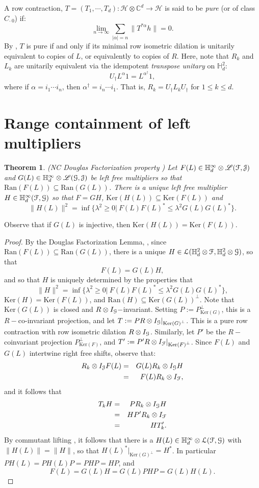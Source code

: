 \documentclass[11pt]{article}
\newcommand{\ba}{\begin{eqnarray}}
\newcommand{\ea}{\end{eqnarray}}
\newcommand{\nn}{\nonumber}
\newcommand{\scr}{\ensuremath{\mathscr}}
\newcommand{\mc}{\ensuremath{\mathcal}}
\newcommand{\la}{\ensuremath{\lambda }}
\def\C{\mathbb{C}}
\def\cH{\mathcal{H}}
\def\bH{\mathbb{H}}
\newcommand{\J}{\ensuremath{\mathcal{J} }}
\newcommand{\ran}[1]{\ensuremath{\mathrm{Ran} \left( {#1} \right) }}
\renewcommand{\ker}[1]{\ensuremath{\mathrm{Ker} \left( {#1} \right) }}
\numberwithin{equation}{section}
\numberwithin{subsection}{section}
\newtheorem{thm}[subsection]{Theorem}
\theoremstyle{definition}
\begin{document}
A row contraction, $T = (T _1 , \cdots , T_d ) : \cH \otimes \C ^d \rightarrow \cH$ is said to be \emph{pure} (or of class $C _{\cdot \ 0}$) if:
$$ \lim _{n \rightarrow \infty } \sum _{|\alpha | = n} \| T^{*\alpha} h \| = 0. $$ 
By \cite[Proposition 2.3]{Pop-dil}, $T$ is pure if and only if its minimal row isometric dilation is unitarily equivalent to copies of $L$, or equivalently to copies of $R$. Here, note that $R_k$ and $L_k$ are unitarily equivalent via the idempotent \emph{transpose unitary} on $\bH ^2 _d$:
$$ U_\dag L^\alpha 1 = L^{\alpha ^\dag} 1, $$ where if $\alpha = i _1 \cdots i _n$, then $\alpha ^\dag = i _n \cdots i _1$. That is, $R_k = U_\dag L_k U_\dag$ for $1 \leq k \leq d$.

\section{Range containment of left multipliers}


\begin{thm}{ (NC Douglas Factorization property \cite[Theorem 5.5]{JM-freeSmirnov})}
Let $F(L) \in \bH ^\infty _d \otimes \scr{L} (\mc{F}, \J)$ and $G(L) \in \bH ^\infty _d \otimes \scr{L} (\mc{G} , \J )$ be left free multipliers so that $\ran{F(L)} \subseteq \ran{G(L)}$. There is a unique left free multiplier
$H \in \bH ^\infty _d (\mc{F} , \mc{G} )$ so that $F = G H $, $\ker{H(L)} \subseteq \ker{F(L) }$ and
$$ \| H(L) \| ^2 = \inf \{ \la ^2 \geq 0 | \ F(L)  F(L) ^* \leq \la ^2 G(L) G(L) ^* \}. $$ 
\end{thm}
Observe that if $G(L)$ is injective, then $\ker{H(L)} = \ker{F(L)}$.
\begin{proof}
By the Douglas Factorization Lemma, \cite{DFL}, since $\ran{F(L)} \subseteq \ran{G(L)}$, there is a unique $H \in \mc{L} (\bH ^2 _d \otimes \mc{F} , \bH ^2 _d \otimes \mc{G} )$, so that 
$$ F(L) = G(L) H, $$ and so that $H$ is uniquely determined by the properties that 
$$ \| H \| ^2 = \inf \{ \la ^2 \geq 0 | \ F(L)  F(L) ^* \leq \la ^2 G(L) G(L) ^* \}, $$
$\ker{H} = \ker{F(L)}$, and $\ran{H} \subseteq \ker{G(L)} ^\perp$. Note that $\ker{G(L)}$ is closed and $R\otimes I_\mc{G}-$invariant. Setting $P := P_{\ker{G}} ^\perp$, this is a $R-$co-invariant projection, and let $T := P R \otimes I_\mc{G} | _{\ker{G} ^\perp}$. This is a pure row contraction with row isometric dilation $R \otimes I_{\mc{G}}$. Similarly, let $P'$ be the $R-$coinvariant projection $P_{\ker{F} } ^\perp$, and $T' := P ' R \otimes I_{\mc{F}} | _{\ker{F} ^\perp}$. Since $F(L)$ and $G(L)$ intertwine right free shifts, observe that:
\ba R _k  \otimes I _{\mc{J}} F(L) & = & G(L) R_k \otimes I _{\mc{G} } H \nn \\
& = & F(L) R_k \otimes I _{\mc{F}}, \nn \ea and it follows that 
\ba T_k H & = & P R_k \otimes I_{\mc{G}} H \nn \\
& = & H P ' R_k \otimes I_{\mc{F}} \nn \\
& = & H T' _k. \nn \ea 
By commutant lifting \cite{Pop-dil}, it follows that there is a $H(L) \in \bH ^\infty _d \otimes \mc{L} ( \mc{F} , \mc{G} )$ with $\| H(L) \| = \| H \|$, so that $H(L) ^* | _{\ker{G} ^\perp} = H^*$. In particular $P H(L) = P H(L) P = P H P = H P$, and 
$$ F(L) = G(L) H = G(L) P H P = G(L) H(L). $$ 
\end{proof}
\end{document}
